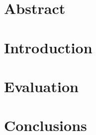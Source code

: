 \documentclass[12pt,a4paper]{report}
\begin{document}


\maketitle
\tableofcontents

\chapter{Abstract}


\chapter{Introduction}






\chapter{Evaluation}




\chapter{Conclusions}


\printglossaries



\end{document}
